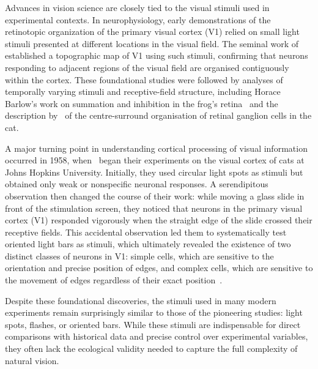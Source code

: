 \documentclass[12pt,a4paper]{article}
\begin{document}
Advances in vision science are closely tied to the visual stimuli used in experimental contexts. In neurophysiology, early demonstrations of the retinotopic organization of the primary visual cortex (V1) relied on small light stimuli presented at different locations in the visual field. The seminal work of~\textcite{Talbot1941} established a topographic map of V1 using such stimuli, confirming that neurons responding to adjacent regions of the visual field are organised contiguously within the cortex. These foundational studies were followed by analyses of temporally varying stimuli and receptive-field structure, including Horace Barlow's work on summation and inhibition in the frog's retina~\parencite{Barlow1953} and the description by~\textcite{Kuffler1953} of the centre-surround organisation of retinal ganglion cells in the cat.

A major turning point in understanding cortical processing of visual information occurred in 1958, when~\textcite{HubelWiesel1959} began their experiments on the visual cortex of cats at Johns Hopkins University. Initially, they used circular light spots as stimuli but obtained only weak or nonspecific neuronal responses. A serendipitous observation then changed the course of their work: while moving a glass slide in front of the stimulation screen, they noticed that neurons in the primary visual cortex (V1) responded vigorously when the straight edge of the slide crossed their receptive fields. This accidental observation led them to systematically test oriented light bars as stimuli, which ultimately revealed the existence of two distinct classes of neurons in V1: simple cells, which are sensitive to the orientation and precise position of edges, and complex cells, which are sensitive to the movement of edges regardless of their exact position~\parencite{HubelWiesel1962}.

Despite these foundational discoveries, the stimuli used in many modern experiments remain surprisingly similar to those of the pioneering studies: light spots, flashes, or oriented bars. While these stimuli are indispensable for direct comparisons with historical data and precise control over experimental variables, they often lack the ecological validity needed to capture the full complexity of natural vision.
\end{document}
